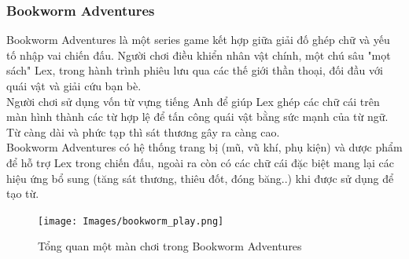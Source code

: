 \subsubsection{Bookworm Adventures}
\hspace*{0.5cm} Bookworm Adventures là một series game kết hợp giữa giải đố ghép chữ và yếu tố nhập vai chiến đấu. Người chơi điều khiển nhân vật chính, một chú sâu "mọt sách" Lex, trong hành trình phiêu lưu qua các thế giới thần thoại, đối đầu với quái vật và giải cứu bạn bè.\\
\hspace*{0.5cm} Người chơi sử dụng vốn từ vựng tiếng Anh để giúp Lex ghép các chữ cái trên màn hình thành các từ hợp lệ để tấn công quái vật bằng sức mạnh của từ ngữ. Từ càng dài và phức tạp thì sát thương gây ra càng cao.\\
\hspace*{0.5cm} Bookworm Adventures có hệ thống trang bị (mũ, vũ khí, phụ kiện) và dược phẩm để hỗ trợ Lex trong chiến đấu, ngoài ra còn có các chữ cái đặc biệt mang lại các hiệu ứng bổ sung (tăng sát thương, thiêu đốt, đóng băng..) khi được sử dụng để tạo từ.
\begin{figure}[H]
	\centering
	\texttt{[image: Images/bookworm\_play.png]}
	\vspace{0.5cm}
	\caption{Tổng quan một màn chơi trong Bookworm Adventures}
\end{figure}
